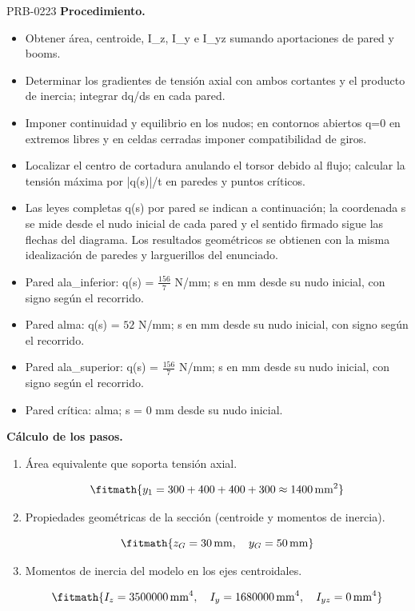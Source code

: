 \begin{studiumworked}{PRB-0223}
\textbf{Procedimiento.}\begin{itemize}\item Obtener área, centroide, I\_z, I\_y e I\_yz sumando aportaciones de pared y booms.
\item Determinar los gradientes de tensión axial con ambos cortantes y el producto de inercia; integrar dq/ds en cada pared.
\item Imponer continuidad y equilibrio en los nudos; en contornos abiertos q=0 en extremos libres y en celdas cerradas imponer compatibilidad de giros.
\item Localizar el centro de cortadura anulando el torsor debido al flujo; calcular la tensión máxima por |q(s)|/t en paredes y puntos críticos.
\item Las leyes completas q(s) por pared se indican a continuación; la coordenada s se mide desde el nudo inicial de cada pared y el sentido firmado sigue las flechas del diagrama. Los resultados geométricos se obtienen con la misma idealización de paredes y larguerillos del enunciado.
\item Pared ala\_inferior: q(s) = $\frac{156}{7}$ N/mm; s en mm desde su nudo inicial, con signo según el recorrido.
\item Pared alma: q(s) = $52$ N/mm; s en mm desde su nudo inicial, con signo según el recorrido.
\item Pared ala\_superior: q(s) = $\frac{156}{7}$ N/mm; s en mm desde su nudo inicial, con signo según el recorrido.
\item Pared crítica: alma; s = 0 mm desde su nudo inicial.\end{itemize}

\textbf{Cálculo de los pasos.}

\begin{enumerate}

\item Área equivalente que soporta tensión axial.

\[\fitmath{y_{1}=300+400+400+300\approx 1400\,\mathrm{mm^{2}}}\]

\item Propiedades geométricas de la sección (centroide y momentos de inercia).

\[\fitmath{z_G=30\,\mathrm{mm},\quad y_G=50\,\mathrm{mm}}\]

\item Momentos de inercia del modelo en los ejes centroidales.

\[\fitmath{I_z=3500000\,\mathrm{mm}^{4},\quad I_y=1680000\,\mathrm{mm}^{4},\quad I_{yz}=0\,\mathrm{mm}^{4}}\]


\end{enumerate}
\end{studiumworked}
